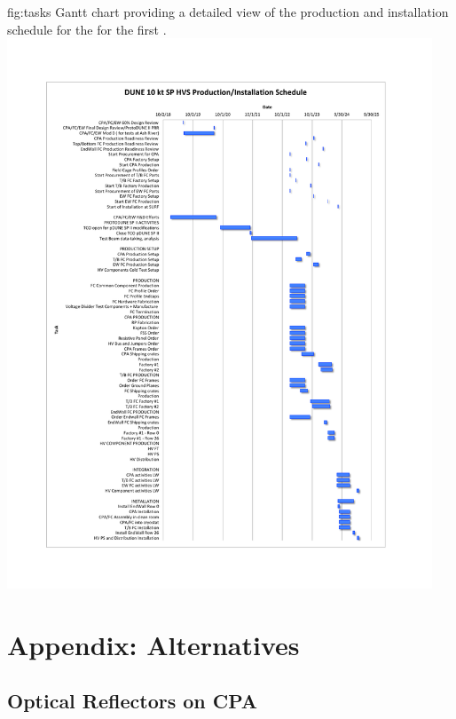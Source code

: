 \begin{dunefigure}{fig:tasks}{
Gantt chart providing a detailed view of the production and installation schedule for the  for the first .}
\includegraphics[width=0.95\textwidth]{graphics/HVS-GANTT-new.pdf}
\end{dunefigure}






\section{Appendix: Alternatives}
\label{sec:fdsp-hv-app-alt}

\subsection{Optical Reflectors on CPA}
\label{sec:fdsp-hv-app-alt-opt}


